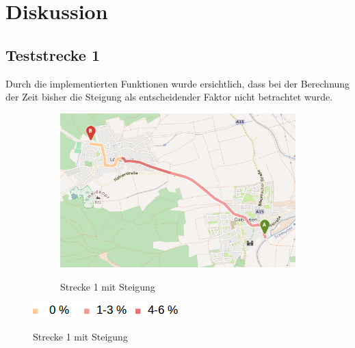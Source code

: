 \section{Diskussion}

\subsection{Teststrecke 1}

Durch die implementierten Funktionen wurde ersichtlich, dass bei der Berechnung der Zeit bisher die Steigung als entscheidender Faktor nicht betrachtet wurde.

\begin{figure}[H]
\centering
\begin{subfigure}{0.80\textwidth}
\centering
\includegraphics[width = \textwidth]{../media/Fahrt1_Steep.png} \\
\caption{Strecke 1 mit Steigung}
\label{fig:steig}
\end{subfigure}

\includegraphics[width =0.25 \textwidth]{../media/legend2.png} \\


\end{figure}
